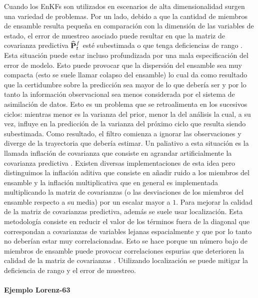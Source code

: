 Cuando los EnKFs son utilizados en escenarios de alta dimensionalidad surgen una variedad de problemas. Por un lado, debido a que la cantidad de miembros de ensamble resulta pequeña en comparación con la dimensión de las variables de estado, el error de muestreo asociado puede resultar en que la matriz de covarianza predictiva $\widehat{\mathbf{P}}_t^f$ esté subestimada o que tenga deficiencias de rango \citep{Miyoshi2011}. Esta situación puede estar incluso profundizada por una mala especificación del error de modelo. Esto puede provocar que la dispersión del ensamble sea muy compacta (esto se suele llamar colapso del ensamble) lo cual da como resultado que la certidumbre sobre la predicción sea mayor de lo que debería ser y por lo tanto la información observacional sea menos considerada por el sistema de asimilación de datos. Esto es un problema que se retroalimenta en los sucesivos ciclos: mientras menor es la varianza del prior, menor la del análisis la cual, a su vez, influye en la predicción de la varianza del próximo ciclo que resulta siendo subestimada. Como resultado, el filtro comienza a ignorar las observaciones y diverge de la trayectoria que debería estimar. Un paliativo a esta situación es la llamada inflación de covarianza que consiste en agrandar artificialmente la covarianza predictiva \citep{Anderson1999}. Existen diversas implementaciones de esta idea pero distinguimos la inflación aditiva que consiste en añadir ruido a los miembros del ensamble y la inflación multiplicativa que en general es implementada multiplicando la matriz de covarianzas (o las desviaciones de los miembros del ensamble respecto a su media) por un escalar mayor a $1$. Para mejorar la calidad de la matriz de covarianzas predictiva, además se suele usar localización. Esta metodología consiste en reducir el valor de los términos fuera de la diagonal que correspondan a covarianzas de variables lejanas espacialmente y que por lo tanto no deberían estar muy correlacionadas. Esto se hace porque un número bajo de miembros de ensamble puede provocar correlaciones espurias que deterioren la calidad de la matriz de covarianzas \citep{Hamill2001}. Utilizando localización se puede mitigar la deficiencia de rango y el error de muestreo. 

\paragraph{Ejemplo Lorenz-63}

